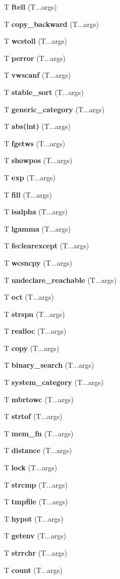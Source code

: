 \begin{DoxyCompactItemize}
T {\bf ftell} (T...\+args)
\item 
T {\bf copy\+\_\+backward} (T...\+args)
\item 
T {\bf wcstoll} (T...\+args)
\item 
T {\bf perror} (T...\+args)
\item 
T {\bf vwscanf} (T...\+args)
\item 
T {\bf stable\+\_\+sort} (T...\+args)
\item 
T {\bf generic\+\_\+category} (T...\+args)
\item 
T {\bf abs(int)} (T...\+args)
\item 
T {\bf fgetws} (T...\+args)
\item 
T {\bf showpos} (T...\+args)
\item 
T {\bf exp} (T...\+args)
\item 
T {\bf fill} (T...\+args)
\item 
T {\bf isalpha} (T...\+args)
\item 
T {\bf lgamma} (T...\+args)
\item 
T {\bf feclearexcept} (T...\+args)
\item 
T {\bf wcsncpy} (T...\+args)
\item 
T {\bf undeclare\+\_\+reachable} (T...\+args)
\item 
T {\bf oct} (T...\+args)
\item 
T {\bf strspn} (T...\+args)
\item 
T {\bf realloc} (T...\+args)
\item 
T {\bf copy} (T...\+args)
\item 
T {\bf binary\+\_\+search} (T...\+args)
\item 
T {\bf system\+\_\+category} (T...\+args)
\item 
T {\bf mbrtowc} (T...\+args)
\item 
T {\bf strtof} (T...\+args)
\item 
T {\bf mem\+\_\+fn} (T...\+args)
\item 
T {\bf distance} (T...\+args)
\item 
T {\bf lock} (T...\+args)
\item 
T {\bf strcmp} (T...\+args)
\item 
T {\bf tmpfile} (T...\+args)
\item 
T {\bf hypot} (T...\+args)
\item 
T {\bf getenv} (T...\+args)
\item 
T {\bf strrchr} (T...\+args)
\item 
T {\bf count} (T...\+args)
\item 

\end{DoxyCompactItemize}
